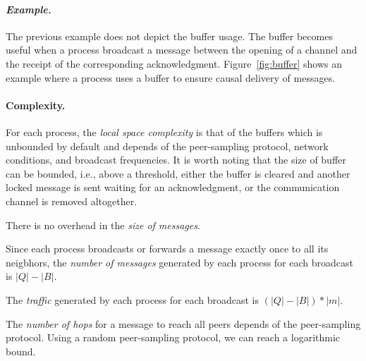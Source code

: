 \paragraph{\emph{Example.}} The previous example does not depict the buffer
usage. The buffer becomes useful when a process broadcast a message between the
opening of a channel and the receipt of the corresponding
acknowledgment. Figure~\ref{fig:buffer} shows an example where a process uses a
buffer to ensure causal delivery of messages. 




\paragraph{Complexity.} For each process, the \emph{local space complexity} is
that of the buffers which is unbounded by default and depends of the
peer-sampling protocol, network conditions, and broadcast frequencies. It is
worth noting that the size of buffer can be bounded, i.e., above a threshold,
either the buffer is cleared and another locked message is sent waiting for an
acknowledgment, or the communication channel is removed altogether.

There is no overhead in the \emph{size of messages}. 

Since each process broadcasts or forwards a message exactly once to all its
neigbhors, the \emph{number of messages} generated by each process for each
broadcast is $|Q|-|B|$. 

The \emph{traffic} generated by each process for each broadcast is
$(|Q|-|B|)*|m|$. 

The \emph{number of hops} for a message to reach all peers depends of the
peer-sampling protocol. Using a random peer-sampling protocol, we can reach a
logarithmic bound.


